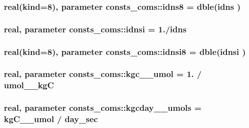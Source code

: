 \subsubsection[{\texorpdfstring{idns8}{idns8}}]{\setlength{\rightskip}{0pt plus 5cm}real(kind=8), parameter consts\+\_\+coms\+::idns8 = dble({\bf idns} )}\hypertarget{namespaceconsts__coms_a8edbbaf553f3bb97c6aa36fd02c06cbd}{}\label{namespaceconsts__coms_a8edbbaf553f3bb97c6aa36fd02c06cbd}
\subsubsection[{\texorpdfstring{idnsi}{idnsi}}]{\setlength{\rightskip}{0pt plus 5cm}real, parameter consts\+\_\+coms\+::idnsi = 1./{\bf idns}}\hypertarget{namespaceconsts__coms_a361a469660d9429305a43049e625c83a}{}\label{namespaceconsts__coms_a361a469660d9429305a43049e625c83a}
\subsubsection[{\texorpdfstring{idnsi8}{idnsi8}}]{\setlength{\rightskip}{0pt plus 5cm}real(kind=8), parameter consts\+\_\+coms\+::idnsi8 = dble({\bf idnsi} )}\hypertarget{namespaceconsts__coms_a9bbee47456466f45fb26089844e13c9b}{}\label{namespaceconsts__coms_a9bbee47456466f45fb26089844e13c9b}
\subsubsection[{\texorpdfstring{kgc\+\_\+2\+\_\+umol}{kgc_2_umol}}]{\setlength{\rightskip}{0pt plus 5cm}real, parameter consts\+\_\+coms\+::kgc\+\_\+\_\+umol = 1. / umol\+\_\+\_\+kgC}\hypertarget{namespaceconsts__coms_ac17190e203b566b6be141ddcd8344ae9}{}\label{namespaceconsts__coms_ac17190e203b566b6be141ddcd8344ae9}
\subsubsection[{\texorpdfstring{kgcday\+\_\+2\+\_\+umols}{kgcday_2_umols}}]{\setlength{\rightskip}{0pt plus 5cm}real, parameter consts\+\_\+coms\+::kgcday\+\_\+\_\+umols = kg\+C\+\_\+\_\+umol / {\bf day\+\_\+sec}}\hypertarget{namespaceconsts__coms_ac60998ed6a6470c03f18f773175c77f4}{}\label{namespaceconsts__coms_ac60998ed6a6470c03f18f773175c77f4}
